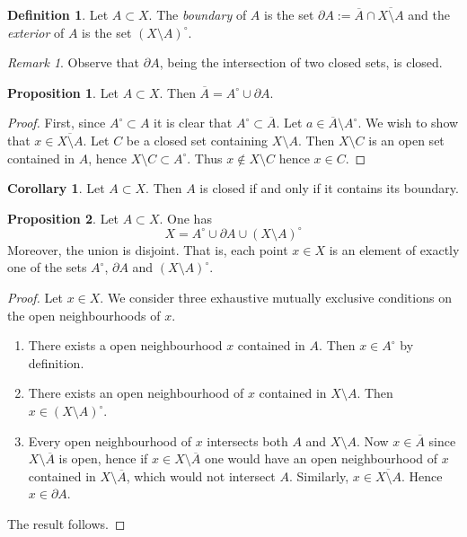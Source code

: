 \documentclass{book}
\theoremstyle{definition}
\newtheorem{proposition}{Proposition}[section]
\newtheorem{corollary}{Corollary}[theorem]
\newtheorem{definition}{Definition}[section]
\theoremstyle{remark}
\newtheorem{remark}{Remark}[section]
\begin{document}
\begin{definition}
Let $A\subset X$. The \textit{boundary} of $A$ is the set $\partial A:=\overline A\cap\overline{X\setminus A}$ and the \textit{exterior} of $A$ is the set $(X\setminus A)^\circ$.
\end{definition}

\begin{remark}
Observe that $\partial A$, being the intersection of two closed sets, is closed.
\end{remark}

\begin{proposition}
Let $A\subset X$. Then $\overline A=A^\circ\cup\partial A$.
\end{proposition}
\begin{proof}
First, since $A^\circ\subset A$ it is clear that $A^\circ\subset\overline A$. Let $a\in\overline A\setminus A^\circ$. We wish to show that $x\in\overline{X\setminus A}$. Let $C$ be a closed set containing $X\setminus A$. Then $X\setminus C$ is an open set contained in $A$, hence $X\setminus C\subset A^\circ$. Thus $x\notin X\setminus C$ hence $x\in C$.
\end{proof}

\begin{corollary}
Let $A\subset X$. Then $A$ is closed if and only if it contains its boundary.
\end{corollary}

\begin{proposition}
\label{intboundandext}
Let $A\subset X$. One has
$$X=A^\circ\cup\partial A\cup (X\setminus A)^\circ$$
Moreover, the union is disjoint. That is, each point $x\in X$ is an element of exactly one of the sets $A^\circ$, $\partial A$ and $(X\setminus A)^\circ$.
\end{proposition}
\begin{proof}
Let $x\in X$. We consider three exhaustive mutually exclusive conditions on the open neighbourhoods of $x$.
\begin{enumerate}
    \item There exists a open neighbourhood $x$ contained in $A$. Then $x\in A^\circ$ by definition.
    \item There exists an open neighbourhood of $x$ contained in $X\setminus A$. Then $x\in (X\setminus A)^\circ$.
    \item Every open neighbourhood of $x$ intersects both $A$ and $X\setminus A$. Now $x\in\overline A$ since $X\setminus\overline A$ is open, hence if $x\in X\setminus\overline A$ one would have an open neighbourhood of $x$ contained in $X\setminus\overline A$, which would not intersect $A$. Similarly, $x\in\overline{X\setminus A}$. Hence $x\in\partial A$.
\end{enumerate}
The result follows.
\end{proof}
\end{document}
